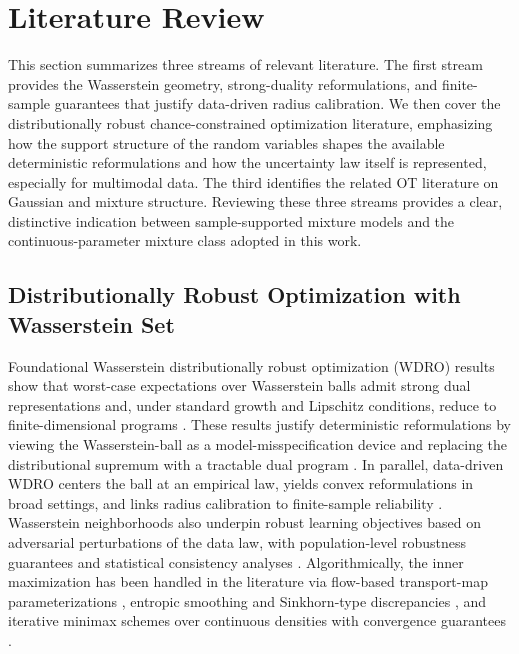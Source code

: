 \documentclass[opre,sglanonrev]{informs4}
\begin{document}
\section{Literature Review}\label{sec: Literature}

This section summarizes three streams of relevant literature. The first stream provides the Wasserstein geometry, strong-duality reformulations, and finite-sample guarantees that justify data-driven radius calibration.    We then cover the distributionally robust chance-constrained optimization literature, emphasizing how the support structure of the random variables shapes the available deterministic reformulations and how the uncertainty law itself is represented, especially for multimodal data. The third identifies the related OT literature on Gaussian and mixture structure.  Reviewing these three streams provides a clear, distinctive indication between sample-supported mixture models and the continuous-parameter mixture class adopted in this work. 



\subsection{Distributionally Robust Optimization with Wasserstein Set}

Foundational Wasserstein distributionally robust optimization (WDRO) results show that worst-case expectations over Wasserstein balls admit strong dual representations and, under standard growth and Lipschitz conditions, reduce to finite-dimensional programs \cite{gao_kleywegt_2023, esfahani_kuhn_2018, blanchet2019quantifying, luo2019decomposition, zhang2024shortDualityWassersteinDRO}. These results justify deterministic reformulations by viewing the Wasserstein-ball as a model-misspecification device and replacing the distributional supremum with a tractable dual program \cite{gao_kleywegt_2023, blanchet2019quantifying, luo2019decomposition, zhang2024shortDualityWassersteinDRO}. In parallel, data-driven WDRO centers the ball at an empirical law, yields convex reformulations in broad settings, and links radius calibration to finite-sample reliability \cite{esfahani_kuhn_2018}. Wasserstein neighborhoods also underpin robust learning objectives based on adversarial perturbations of the data law, with population-level robustness guarantees and statistical consistency analyses \cite{sinha2018certifyingRobustness, kwon2020wassersteinLocalPerturbations}. Algorithmically, the inner maximization has been handled in the literature via flow-based transport-map parameterizations \cite{xu2024flowdro}, entropic smoothing and Sinkhorn-type discrepancies \cite{wang2025sinkhorn}, and iterative minimax schemes over continuous densities with convergence guarantees \cite{zhu2024iterativeMinimaxWasserstein}.
\end{document}
